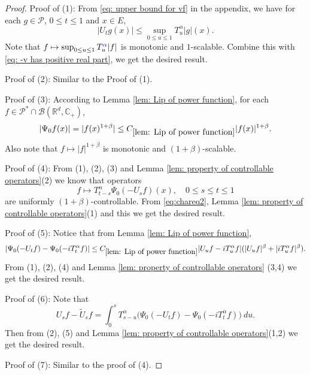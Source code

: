 \documentclass[12pt,oneside,english]{amsart}
\theoremstyle{plain}
\theoremstyle{definition}
\numberwithin{equation}{section}
\newcommand{\added}[1]{{\color{blue}#1}}\newcommand{\deleted}[1]{{\color{red}#1}}
\begin{document}
\begin{proof}
    Proof of (1): From \eqref{eq: upper bound for vf} in the appendix, we have for each $g\in \mathcal P$, $0\leq t\leq 1$ and $x\in E$,
\[
    |U_t g(x)|
    \leq \sup_{0\leq u\leq 1}T_u^\alpha |g| (x).
\]
    Note that $f\mapsto\sup_{0\leq u\leq 1}T^{\added{\alpha}}_u|f|$ is monotonic and $1$-scalable.
    \added{Combine this with \eqref{eq: -v has positive real part}, we get the desired result.}

    Proof of (2): Similar to the Proof of (1).

    Proof of (3): According to Lemma \ref{lem: Lip of power function}, for each $f\in \mathcal P^* \cap \mathcal B(\mathbb R^d, \mathbb C_+)$,
\[
    |\Psi_0 f(x)| = |f(x)^{1+\beta}| \leq C_{\ref{lem: Lip of power function}} |f(x)|^{1+\beta}.
\]
    Also note that $f\mapsto |f|^{1+\beta}$ is monotonic and $(1+\beta)$-scalable.

    Proof of (4): From (1), (2), (3) and Lemma \ref{lem: property of controllable operators}(2) we know that operators
\[
    f
    \mapsto T^{\alpha}_{t-s}\Psi_0(-U_sf)(x),
    \quad 0\leq s\leq t\leq 1
\]
    are uniformly $(1+\beta)$-controllable.
    From \added{\eqref{eq:chareq2},} Lemma \ref{lem: property of controllable operators}(1) and this we get the desired result.

    Proof of (5): Notice that from Lemma \ref{lem: Lip of power function},
\[
    |\Psi_0(-U_t f) - \Psi_0(-iT_t^\alpha f) |
    \leq  C_{\ref{lem: Lip of power function}} |U_u f-iT_u^{\alpha}f|(|U_u f|^{\beta}+|i T_u^{\alpha}f|^{\beta}).
\]
    From (1), (2), (4) and Lemma \ref{lem: property of controllable operators} (3,4) we get the desired result.

    Proof of (6): Note that
\[
    U_sf - \tilde U_sf
    = \int_0^s T_{s-u}^{\alpha}\big(\Psi_0(-U_t f)-\Psi_0(-i T_t^{\alpha}f)\big)~du.
\]
    Then from (2), (5) and Lemma \ref{lem: property of controllable operators}(1,2) we get the desired result.

    Proof of (7): Similar to the proof of (4).
\end{proof}
\end{document}
